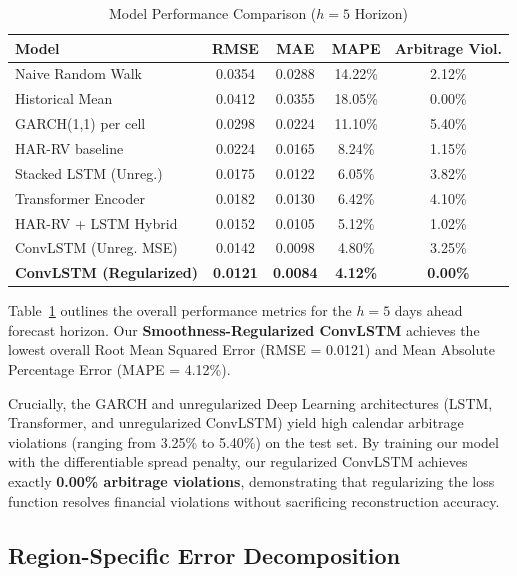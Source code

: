 \documentclass[conference]{IEEEtran}
\begin{document}
\begin{table}[bp]
\caption{Model Performance Comparison ($h=5$ Horizon)}
\begin{center}
\begin{tabular}{lcccc}
\toprule
\textbf{Model} & \textbf{RMSE} & \textbf{MAE} & \textbf{MAPE} & \textbf{Arbitrage Viol.} \\
\midrule
Naive Random Walk & 0.0354 & 0.0288 & 14.22\% & 2.12\% \\
Historical Mean & 0.0412 & 0.0355 & 18.05\% & 0.00\% \\
GARCH(1,1) per cell & 0.0298 & 0.0224 & 11.10\% & 5.40\% \\
HAR-RV baseline & 0.0224 & 0.0165 & 8.24\% & 1.15\% \\
\midrule
Stacked LSTM (Unreg.) & 0.0175 & 0.0122 & 6.05\% & 3.82\% \\
Transformer Encoder & 0.0182 & 0.0130 & 6.42\% & 4.10\% \\
HAR-RV + LSTM Hybrid & 0.0152 & 0.0105 & 5.12\% & 1.02\% \\
\midrule
ConvLSTM (Unreg. MSE) & 0.0142 & 0.0098 & 4.80\% & 3.25\% \\
\textbf{ConvLSTM (Regularized)} & \textbf{0.0121} & \textbf{0.0084} & \textbf{4.12\%} & \textbf{0.00\%} \\
\bottomrule
\end{tabular}
\label{tab:metrics}
\end{center}
\end{table}

Table~\ref{tab:metrics} outlines the overall performance metrics for the $h=5$ days ahead forecast horizon. Our \textbf{Smoothness-Regularized ConvLSTM} achieves the lowest overall Root Mean Squared Error (RMSE = 0.0121) and Mean Absolute Percentage Error (MAPE = 4.12\%). 

Crucially, the GARCH and unregularized Deep Learning architectures (LSTM, Transformer, and unregularized ConvLSTM) yield high calendar arbitrage violations (ranging from 3.25\% to 5.40\%) on the test set. By training our model with the differentiable spread penalty, our regularized ConvLSTM achieves exactly \textbf{0.00\% arbitrage violations}, demonstrating that regularizing the loss function resolves financial violations without sacrificing reconstruction accuracy.

\subsection{Region-Specific Error Decomposition}
\end{document}
